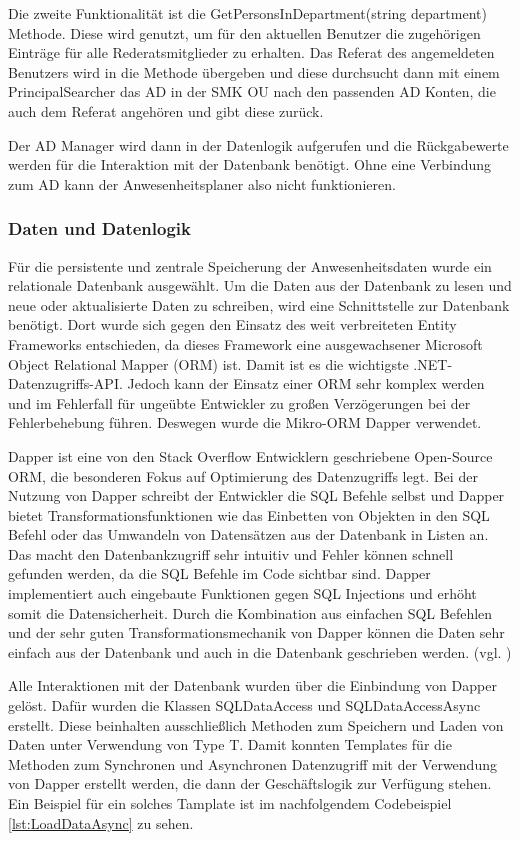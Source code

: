 Die zweite Funktionalität ist die GetPersonsInDepartment(string department) Methode. Diese wird genutzt, um für den aktuellen Benutzer die zugehörigen Einträge für alle Rederatsmitglieder zu erhalten. Das Referat des angemeldeten Benutzers wird in die Methode übergeben und diese durchsucht dann mit einem PrincipalSearcher das AD in der SMK OU nach den passenden AD Konten, die auch dem Referat angehören und gibt diese zurück.

Der AD Manager wird dann in der Datenlogik aufgerufen und die Rückgabewerte werden für die Interaktion mit der Datenbank benötigt. Ohne eine Verbindung zum AD kann der Anwesenheitsplaner also nicht funktionieren.

\subsubsection{Daten und Datenlogik}
\label{sec:Daten}
Für die persistente und zentrale Speicherung der Anwesenheitsdaten wurde ein relationale Datenbank ausgewählt. Um die Daten aus der Datenbank zu lesen und neue oder aktualisierte Daten zu schreiben, wird eine Schnittstelle zur Datenbank benötigt. Dort wurde sich gegen den Einsatz des weit verbreiteten Entity Frameworks entschieden, da dieses Framework eine ausgewachsener Microsoft Object Relational Mapper (ORM) ist. Damit ist es die wichtigste .NET-Datenzugriffs-API. Jedoch kann der Einsatz einer ORM sehr komplex werden und im Fehlerfall für ungeübte Entwickler zu großen Verzögerungen bei der Fehlerbehebung führen. Deswegen wurde die Mikro-ORM Dapper verwendet.

Dapper ist eine von den Stack Overflow Entwicklern geschriebene Open-Source ORM, die besonderen Fokus auf Optimierung des Datenzugriffs legt. Bei der Nutzung von Dapper schreibt der Entwickler die SQL Befehle selbst und Dapper bietet Transformationsfunktionen wie \zB das Einbetten von Objekten in den SQL Befehl oder das Umwandeln von Datensätzen aus der Datenbank in Listen an. Das macht den Datenbankzugriff sehr intuitiv und Fehler können schnell gefunden werden, da die SQL Befehle im Code sichtbar sind. Dapper implementiert auch eingebaute Funktionen gegen SQL Injections und erhöht somit die Datensicherheit. Durch die Kombination aus einfachen SQL Befehlen und der sehr guten Transformationsmechanik von Dapper können die Daten sehr einfach aus der Datenbank und auch in die Datenbank geschrieben werden. (vgl. \cite{Dapper})

Alle Interaktionen mit der Datenbank wurden über die Einbindung von Dapper gelöst. Dafür wurden die Klassen SQLDataAccess und SQLDataAccessAsync erstellt. Diese beinhalten ausschließlich Methoden zum Speichern und Laden von Daten unter Verwendung von Type T. Damit konnten Templates für die Methoden zum Synchronen und Asynchronen Datenzugriff mit der Verwendung von Dapper erstellt werden, die dann der Geschäftslogik zur Verfügung stehen. Ein Beispiel für ein solches Tamplate ist im nachfolgendem Codebeispiel \ref{lst:LoadDataAsync} zu sehen.
\\

